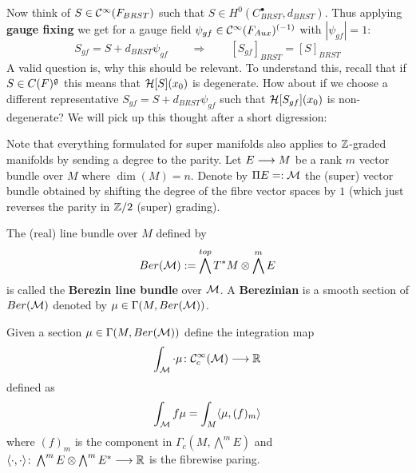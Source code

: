 Now think of $S \in \mathcal{C}^{\infty}(F_{BRST})$ such that $S \in H^0(C^\bullet_{BRST}, d_{BRST})$. Thus applying \textbf{gauge fixing} we get for a gauge field $\psi_{gf} \in \mathcal{C}^{\infty}(F_{Aux})^{(-1)}$ with $|\psi_{gf}| = 1$:
\begin{equation}
  S_{gf} = S + d_{BRST} \psi_{gf} \quad \quad \Longrightarrow \quad \quad  [S_{gf}]_{BRST} = [S]_{BRST}
\end{equation}
A valid question is, why this should be relevant. To understand this, recall that if $S \in C(F)^{\mathfrak{g}}$ this means that ${\mathcal{H}}[S](x_0)$ is degenerate. How about if we choose a different representative $S_{gf} = S + d_{BRST} \psi_{gf}$ such that ${\mathcal{H}}[S_{gf}](x_0)$ is non-degenerate? We will pick up this thought after a short digression:

\begin{rem}
  Note that everything formulated for super manifolds also applies to $\mathbb{Z}$-graded manifolds by sending a degree to the parity. Let $E \longrightarrow M$ be a rank $m$ vector bundle over $M$ where $\dim(M) = n$. Denote by $\Pi E=: \mathcal{M}$ the (super) vector bundle obtained by shifting the degree of the fibre vector spaces by $1$ (which just reverses the parity in $\mathbb{Z}/2$ (super) grading).

  \begin{definition}
    The (real) line bundle over $M$ defined by
    \begin{equation}Ber(\mathcal{M}) := \bigwedge^{top} T^*M \otimes \bigwedge^m E \end{equation}
    is called the \textbf{Berezin line bundle} over $\mathcal{M}$. A \textbf{Berezinian} is a smooth section of $Ber(\mathcal{M})$ denoted by $\mu \in \Gamma(M, Ber(\mathcal{M}))$.
  \end{definition}

  \begin{definition}
    Given a section $\mu \in \Gamma(M, Ber(\mathcal{M}))$ define the integration map
    \begin{equation}\int_{\mathcal{M}} \cdot \mu \colon \mathcal{C}^{\infty}_c(\mathcal{M}) \longrightarrow \mathbb{R} \end{equation}
    defined as
    \begin{equation}\int_{\mathcal{M}} f \mu = \int_M \langle \mu, (f)_m \rangle \end{equation}
    where $(f)_m$ is the component in $\Gamma_c(M, \bigwedge^m E)$ and $\langle \cdot, \cdot \rangle \colon \bigwedge^m E \otimes \bigwedge^m E^* \longrightarrow \mathbb{R}$ is the fibrewise paring.
  \end{definition}


\end{rem}
